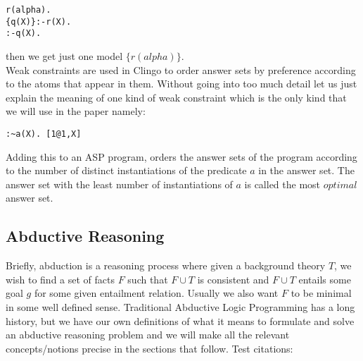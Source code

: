 \begin{lstlisting}[frame=none]
r(alpha).
{q(X)}:-r(X).
:-q(X).
\end{lstlisting}
then we get just one model $\{r(alpha)\}$.\\
Weak constraints are used in Clingo to order answer sets by preference according to the atoms that appear in them. Without going into too much detail let us just explain the meaning of one kind of weak constraint which is the only kind that we will use in the paper namely:
\begin{lstlisting}[frame=none]
:~a(X). [1@1,X]
\end{lstlisting}
Adding this to an ASP program, orders the answer sets of the program according to the number of distinct instantiations of the predicate $a$ in the answer set. The answer set with the least number of instantiations of $a$ is called the most $optimal$ answer set. 
\subsection{Abductive Reasoning}
Briefly, abduction is a reasoning process where given a background theory $T$, we wish to find a set of facts $F$ such that $F\cup T$ is consistent and $F\cup T$ entails some goal $g$ for some given entailment relation. Usually we also want $F$ to be minimal in some well defined sense. Traditional Abductive Logic Programming has a long history, but we have our own definitions of what it means to formulate and solve an abductive reasoning problem and we will make all the relevant concepts/notions precise in the sections that follow.  
Test citations: \cite{lim22:_autom_defeas_reason_law,mahajan22:_overv_cclaw_l4}

